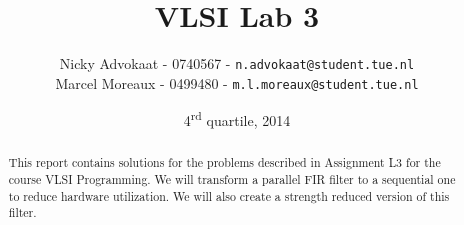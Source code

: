 \documentclass[a4paper,twoside,11pt]{article}
\title{\vspace{-\baselineskip}\sffamily\bfseries VLSI Lab 3}
\author{
Nicky Advokaat - 0740567 - {\tt n.advokaat@student.tue.nl} \\
Marcel  Moreaux - 0499480 - {\tt  m.l.moreaux@student.tue.nl}\\
}
\date{4\textsuperscript{rd} quartile, 2014}
\numberwithin{equation}{section}
\begin{document}
\maketitle
\thispagestyle{empty}
\begin{abstract}
This report contains solutions for the problems described in Assignment L3 for the course VLSI Programming. We will transform a parallel FIR filter to a sequential one to reduce hardware utilization. We will also create a strength reduced version of this filter.
\end{abstract}

\tableofcontents

\newpage








\end{document}
